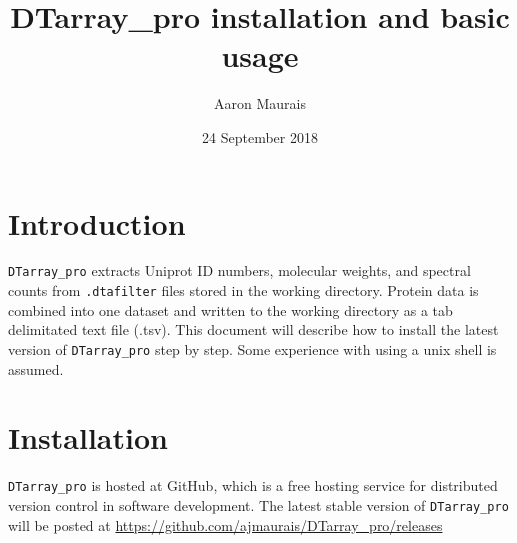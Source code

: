 \documentclass[12pt]{article}
\begin{document}
	
	\title{DTarray\_pro installation and basic usage}
	\author{Aaron Maurais}
	\date{24 September 2018}
	
	\maketitle
	\tableofcontents
	
	\section{Introduction}
	
	\texttt{DTarray\_pro} extracts Uniprot ID numbers, molecular weights, and spectral counts from \texttt{.dtafilter} files stored in the working directory. Protein data is combined into one dataset and written to the working directory as a tab delimitated text file (.tsv). This document will describe how to install the latest version of \texttt{DTarray\_pro} step by step. Some experience with using a unix shell is assumed.  
		
	\section{Installation}
	
	\texttt{DTarray\_pro} is hosted at GitHub, which is a free hosting service for distributed version control in software development.  
	The latest stable version of \texttt{DTarray\_pro} will be posted at \url{https://github.com/ajmaurais/DTarray_pro/releases}
	
\end{document}
